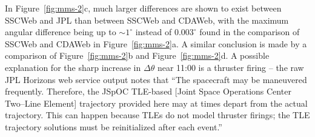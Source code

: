 \documentclass[draft]{agujournal2019}
\begin{document}
In Figure~\ref{fig:mms-2}c, much larger differences are shown to exist between SSCWeb and JPL than between SSCWeb and CDAWeb, with the maximum angular difference being up to ${\sim}1^\circ$ instead of $0.003^\circ$ found in the comparison of SSCWeb and CDAWeb in Figure~\ref{fig:mms-2}a. A similar conclusion is made by a comparison of Figure~\ref{fig:mms-2}b and Figure~\ref{fig:mms-2}d. A possible explanation for the sharp increase in $\Delta \theta$ near 11:00 is a thruster firing  -- the raw JPL Horizons web service output notes that ``The spacecraft may be maneuvered frequently. Therefore, the JSpOC TLE-based [Joint Space Operations Center Two--Line Element] trajectory provided here may at times depart from the actual trajectory. This can happen because TLEs do not model thruster firings; the TLE trajectory solutions must be reinitialized after each event.''





\end{document}
